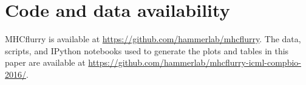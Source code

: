 \section{Code and data availability}
MHCflurry is available at \href{https://github.com/hammerlab/mhcflurry}{https://github.com/hammerlab/mhcflurry}. The data, scripts, and IPython\cite{Perez_2007} notebooks used to generate the plots and tables in this paper are available at \href{https://github.com/hammerlab/mhcflurry-icml-compbio-2016}{https://github.com/hammerlab/mhcflurry-icml-compbio-2016/}. 